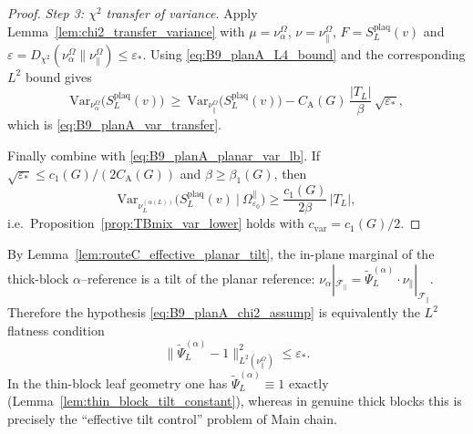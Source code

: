\begin{proof}
\smallskip
\noindent\emph{Step 3: $\chi^2$ transfer of variance.}
Apply Lemma~\ref{lem:chi2_transfer_variance} with $\mu=\nu_{\alpha}^{\Omega}$, $\nu=\nu_{\parallel}^{\Omega}$, $F=S_L^{\mathrm{plaq}}(v)$ and
$\varepsilon=D_{\chi^2}(\nu_{\alpha}^{\Omega}\|\nu_{\parallel}^{\Omega})\le \varepsilon_{\ast}$.
Using \eqref{eq:B9_planA_L4_bound} and the corresponding $L^2$ bound gives
\[
\mathrm{Var}_{\nu_{\alpha}^{\Omega}}\big(S_L^{\mathrm{plaq}}(v)\big)
\ \ge\
\mathrm{Var}_{\nu_{\parallel}^{\Omega}}\big(S_L^{\mathrm{plaq}}(v)\big)
-
C_{\mathrm{A}}(G)\,\frac{|T_L|}{\beta}\,\sqrt{\varepsilon_{\ast}},
\]
which is \eqref{eq:B9_planA_var_transfer}.

Finally combine with \eqref{eq:B9_planA_planar_var_lb}.
If $\sqrt{\varepsilon_{\ast}}\le c_1(G)/(2C_{\mathrm{A}}(G))$ and $\beta\ge \beta_1(G)$, then
\[
\mathrm{Var}_{\nu_L^{(\alpha(L))}}\!\Big(S_L^{\mathrm{plaq}}(v)\ \Big|\ \Omega_{\varepsilon_0}^{\parallel}\Big)
\ge \frac{c_1(G)}{2\beta}\,|T_L|,
\]
i.e.\ Proposition~\ref{prop:TBmix_var_lower} holds with $c_{\mathrm{var}}=c_1(G)/2$.
\end{proof}

\begin{remark}\label{rem:B9_planA_chi2_is_tilt}
By Lemma~\ref{lem:routeC_effective_planar_tilt}, the in-plane marginal of the thick-block $\alpha$--reference is a tilt of the planar reference:
$\nu_{\alpha}|_{\mathscr F_{\parallel}}=\widetilde\Psi_L^{(\alpha)}\cdot \nu_{\parallel}|_{\mathscr F_{\parallel}}$.
Therefore the hypothesis \eqref{eq:B9_planA_chi2_assump} is equivalently the $L^2$ flatness condition
\[
\|\widetilde\Psi_L^{(\alpha)}-1\|_{L^2(\nu_{\parallel}^{\Omega})}^2\le \varepsilon_{\ast}.
\]
In the thin-block leaf geometry one has $\widetilde\Psi_L^{(\alpha)}\equiv 1$ exactly (Lemma~\ref{lem:thin_block_tilt_constant}),
whereas in genuine thick blocks this is precisely the ``effective tilt control'' problem of Main chain.
\end{remark}




